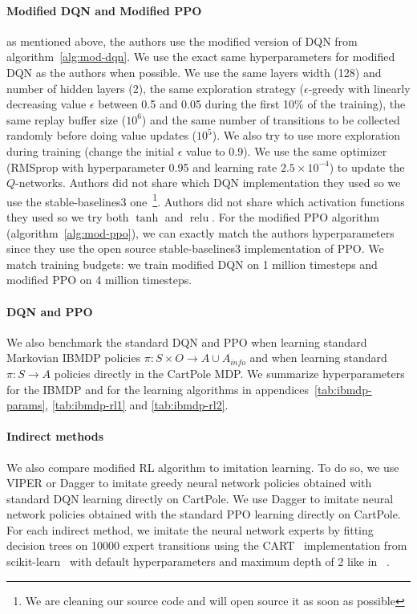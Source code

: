 \paragraph{Modified DQN and Modified PPO} as mentioned above, the authors use the modified version of DQN from algorithm~\ref{alg:mod-dqn}.
We use the exact same hyperparameters for modified DQN as the authors when possible. 
We use the same layers width (128) and number of hidden layers (2), the same exploration strategy ($\epsilon$-greedy with linearly decreasing value $\epsilon$ between 0.5 and 0.05 during the first 10\% of the training),
the same replay buffer size ($10^6$) and the same number of transitions to be collected randomly before doing value updates ($10^5$).
We also try to use more exploration during training (change the initial $\epsilon$ value to 0.9).
We use the same optimizer (RMSprop with hyperparameter 0.95 and learning rate $2.5 \times 10^{-4}$) to update the $Q$-networks.
Authors did not share which DQN implementation they used so we use the stable-baselines3 one~\citep{stable-baselines3}\footnote{We are cleaning our source code and will open source it as soon as possible}.
Authors did not share which activation functions they used so we try both $\operatorname{tanh}$ and $\operatorname{relu}$. 
For the modified PPO algorithm (algorithm~\ref{alg:mod-ppo}), we can exactly match the authors hyperparameters since they use the open source stable-baselines3 implementation of PPO.
We match training budgets: we train modified DQN on 1 million timesteps and modified PPO on 4 million timesteps.

\paragraph{DQN and PPO} We also benchmark the standard DQN and PPO when learning standard Markovian IBMDP policies $\pi:S\times O\rightarrow A\cup A_{info}$ and when learning standard $\pi:S\rightarrow A$ policies directly in the CartPole MDP.
We summarize hyperparameters for the IBMDP and for the learning algorithms in appendices~\ref{tab:ibmdp-params}, \ref{tab:ibmdp-rl1} and \ref{tab:ibmdp-rl2}.

\paragraph{Indirect methods} We also compare modified RL algorithm to imitation learning.
To do so, we use VIPER or Dagger to imitate greedy neural network policies obtained with standard DQN learning directly on CartPole.
We use Dagger to imitate neural network policies obtained with the standard PPO learning directly on CartPole. 
For each indirect method, we imitate the neural network experts by fitting decision trees on 10000 expert transitions using the CART~\citep{breiman1984classification} implementation from scikit-learn~\citep{scikit-learn} with default hyperparameters and maximum depth of 2 like in ~\citep{topin2021iterative}.
    
